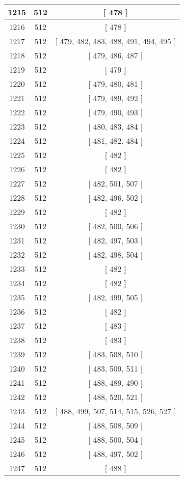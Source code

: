 \begin{center}
\begin{longtable}[H]{|| c c c ||}
\hline
1215 & 512 & [ 478 ] \\ 
\hline
1216 & 512 & [ 478 ] \\ 
\hline
1217 & 512 & [ 479, 482, 483, 488, 491, 494, 495 ] \\ 
\hline
1218 & 512 & [ 479, 486, 487 ] \\ 
\hline
1219 & 512 & [ 479 ] \\ 
\hline
1220 & 512 & [ 479, 480, 481 ] \\ 
\hline
1221 & 512 & [ 479, 489, 492 ] \\ 
\hline
1222 & 512 & [ 479, 490, 493 ] \\ 
\hline
1223 & 512 & [ 480, 483, 484 ] \\ 
\hline
1224 & 512 & [ 481, 482, 484 ] \\ 
\hline
1225 & 512 & [ 482 ] \\ 
\hline
1226 & 512 & [ 482 ] \\ 
\hline
1227 & 512 & [ 482, 501, 507 ] \\ 
\hline
1228 & 512 & [ 482, 496, 502 ] \\ 
\hline
1229 & 512 & [ 482 ] \\ 
\hline
1230 & 512 & [ 482, 500, 506 ] \\ 
\hline
1231 & 512 & [ 482, 497, 503 ] \\ 
\hline
1232 & 512 & [ 482, 498, 504 ] \\ 
\hline
1233 & 512 & [ 482 ] \\ 
\hline
1234 & 512 & [ 482 ] \\ 
\hline
1235 & 512 & [ 482, 499, 505 ] \\ 
\hline
1236 & 512 & [ 482 ] \\ 
\hline
1237 & 512 & [ 483 ] \\ 
\hline
1238 & 512 & [ 483 ] \\ 
\hline
1239 & 512 & [ 483, 508, 510 ] \\ 
\hline
1240 & 512 & [ 483, 509, 511 ] \\ 
\hline
1241 & 512 & [ 488, 489, 490 ] \\ 
\hline
1242 & 512 & [ 488, 520, 521 ] \\ 
\hline
1243 & 512 & [ 488, 499, 507, 514, 515, 526, 527 ] \\ 
\hline
1244 & 512 & [ 488, 508, 509 ] \\ 
\hline
1245 & 512 & [ 488, 500, 504 ] \\ 
\hline
1246 & 512 & [ 488, 497, 502 ] \\ 
\hline
1247 & 512 & [ 488 ] \\ 

\end{longtable}
\end{center}
